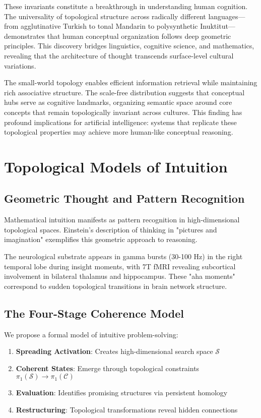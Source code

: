 \documentclass[11pt]{article}
\begin{document}
These invariants constitute a breakthrough in understanding human cognition. The universality of topological structure across radically different languages—from agglutinative Turkish to tonal Mandarin to polysynthetic Inuktitut—demonstrates that human conceptual organization follows deep geometric principles. This discovery bridges linguistics, cognitive science, and mathematics, revealing that the architecture of thought transcends surface-level cultural variations.

The small-world topology enables efficient information retrieval while maintaining rich associative structure. The scale-free distribution suggests that conceptual hubs serve as cognitive landmarks, organizing semantic space around core concepts that remain topologically invariant across cultures. This finding has profound implications for artificial intelligence: systems that replicate these topological properties may achieve more human-like conceptual reasoning.

\section{Topological Models of Intuition}

\subsection{Geometric Thought and Pattern Recognition}

Mathematical intuition manifests as pattern recognition in high-dimensional topological spaces. Einstein's description of thinking in "pictures and imagination" exemplifies this geometric approach to reasoning.

The neurological substrate appears in gamma bursts (30-100 Hz) in the right temporal lobe during insight moments, with 7T fMRI revealing subcortical involvement in bilateral thalamus and hippocampus. These "aha moments" correspond to sudden topological transitions in brain network structure.

\subsection{The Four-Stage Coherence Model}

We propose a formal model of intuitive problem-solving:

\begin{enumerate}
\item \textbf{Spreading Activation}: Creates high-dimensional search space $\mathcal{S}$
\item \textbf{Coherent States}: Emerge through topological constraints $\pi_1(\mathcal{S}) \to \pi_1(\mathcal{C})$  
\item \textbf{Evaluation}: Identifies promising structures via persistent homology
\item \textbf{Restructuring}: Topological transformations reveal hidden connections
\end{enumerate}
\end{document}
